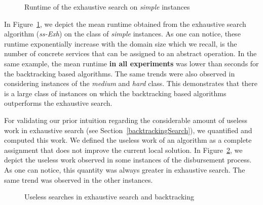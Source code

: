 \documentclass[a4paper]{article}
\begin{document}
\begin{figure}[ht]
\centering
{}


\caption{Runtime of the exhaustive search on {\it simple} instances}
\label{Time-ss-Exh}
\end{figure}


In Figure~\ref{Time-ss-Exh}, we depict the mean runtime obtained from the exhaustive 
search algorithm ({\it ss-Exh}) on the class of {\it simple} instances. As one can notice, these 
runtime exponentially increase with the domain size which we recall, is the number of concrete 
services that can be assigned to an abstract operation. In the same example, the mean runtime {\bf in all experiments }
was lower than  seconds for the backtracking based algorithms. The same trends were also observed in 
considering instances of the {\it medium} and {\it hard} class. This demonstrates that there is 
a large class of instances on which the backtracking based algorithms outperforms the exhaustive search. 

For validating our prior intuition regarding the considerable amount of useless work in exhaustive 
search (see Section~\ref{backtrackingSearch}), we quantified and computed this work. We defined the 
useless work of an algorithm as a complete assignment that does not improve the current 
local solution. In Figure~\ref{UselessExh}, we depict the useless work observed in some instances of the 
disbursement process. As one can notice, this quantity was always greater in exhaustive search. The 
same trend was observed in the other instances. 

\begin{figure}[ht]
\centering
{}

\caption{Useless searches in exhaustive search and backtracking}
\label{UselessExh}
\end{figure}
\end{document}
